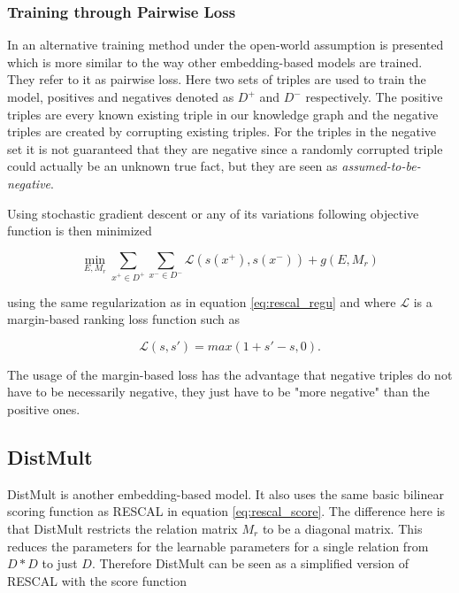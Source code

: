 \subsubsection{Training through Pairwise Loss}
In \cite{nickel_review_2015} an alternative training method under the open-world assumption is presented which is more similar to the way other embedding-based models are trained. They refer to it as pairwise loss. Here two sets of triples are used to train the model, positives and negatives denoted as $D^+$ and $D^-$ respectively. The positive triples are every known existing triple in our knowledge graph and the negative triples are created by corrupting existing triples. For the triples in the negative set it is not guaranteed that they are negative since a randomly corrupted triple could actually be an unknown true fact, but they are seen as \textit{assumed-to-be-negative}.

Using stochastic gradient descent or any of its variations following objective function is then minimized 

\begin{equation}
\label{rescal_pairwise}
\min_{E,M_r} \sum_{x^+ \in D^+} \sum_{x^- \in D^-} \mathcal{L}(s(x^+), s(x^-)) + g(E, M_r)
\end{equation}

using the same regularization as in equation \ref{eq:rescal_regu} and where $\mathcal{L}$ is a margin-based ranking loss function such as

\begin{equation}
\label{eq:rescal_loss}
\mathcal{L}(s,s') = max(1+s'-s,0).
\end{equation}
 
The usage of the margin-based loss has the advantage that negative triples do not have to be necessarily negative, they just have to be "more negative" than the positive ones. 

\subsection{DistMult}
\label{cha:distmult}
DistMult \cite{yang_embedding_2015} is another embedding-based model. It also uses the same basic bilinear scoring function as RESCAL in equation \ref{eq:rescal_score}. The difference here is that DistMult restricts the relation matrix $M_r$ to be a diagonal matrix. This reduces the parameters for the learnable parameters for a single relation from $D*D$ to just $D$. Therefore DistMult can be seen as a simplified version of RESCAL with the score function

